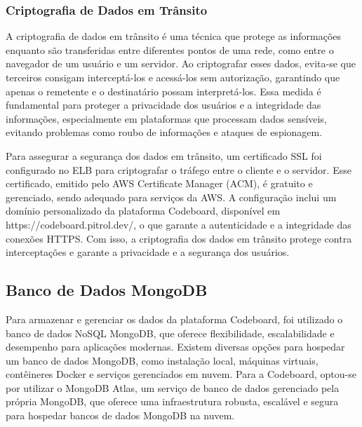 \subsubsection{Criptografia de Dados em Trânsito}

A criptografia de dados em trânsito é uma técnica que protege as informações enquanto são transferidas entre diferentes pontos de uma rede, como entre o navegador de um usuário e um servidor. Ao criptografar esses dados, evita-se que terceiros consigam interceptá-los e acessá-los sem autorização, garantindo que apenas o remetente e o destinatário possam interpretá-los. Essa medida é fundamental para proteger a privacidade dos usuários e a integridade das informações, especialmente em plataformas que processam dados sensíveis, evitando problemas como roubo de informações e ataques de espionagem.

Para assegurar a segurança dos dados em trânsito, um certificado SSL foi configurado no ELB para criptografar o tráfego entre o cliente e o servidor. Esse certificado, emitido pelo AWS Certificate Manager (ACM), é gratuito e gerenciado, sendo adequado para serviços da AWS. A configuração inclui um domínio personalizado da plataforma Codeboard, disponível em https://codeboard.pitrol.dev/, o que garante a autenticidade e a integridade das conexões HTTPS. Com isso, a criptografia dos dados em trânsito protege contra interceptações e garante a privacidade e a segurança dos usuários.


\subsection{Banco de Dados MongoDB}

Para armazenar e gerenciar os dados da plataforma Codeboard, foi utilizado o banco de dados NoSQL MongoDB, que oferece flexibilidade, escalabilidade e desempenho para aplicações modernas. Existem diversas opções para hospedar um banco de dados MongoDB, como instalação local, máquinas virtuais, contêineres Docker e serviços gerenciados em nuvem. Para a Codeboard, optou-se por utilizar o MongoDB Atlas, um serviço de banco de dados gerenciado pela própria MongoDB, que oferece uma infraestrutura robusta, escalável e segura para hospedar bancos de dados MongoDB na nuvem.


